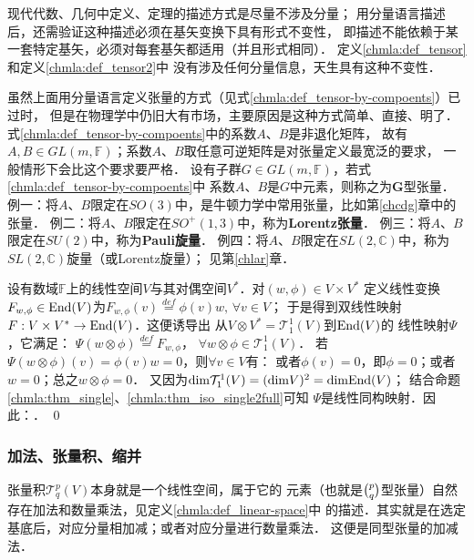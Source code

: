 现代代数、几何中定义、定理的描述方式是尽量不涉及分量；
用分量语言描述后，还需验证这种描述必须在基矢变换下具有形式不变性，
即描述不能依赖于某一套特定基矢，必须对每套基矢都适用（并且形式相同）．
定义\ref{chmla:def_tensor}和定义\ref{chmla:def_tensor2}中
没有涉及任何分量信息，天生具有这种不变性．

虽然上面用分量语言定义张量的方式（见式\eqref{chmla:def_tensor-by-compoents}）已过时，
但是在物理学中仍旧大有市场，主要原因是这种方式简单、直接、明了．
式\eqref{chmla:def_tensor-by-compoents}中的系数$A$、$B$是非退化矩阵，
故有$A,B\in GL(m,\mathbb{F})$；系数$A$、$B$取任意可逆矩阵是对张量定义最宽泛的要求，
一般情形下会比这个要求要严格．
设有子群$G\in GL(m,\mathbb{F})$，若式\eqref{chmla:def_tensor-by-compoents}中
系数$A$、$B$是$G$中元素，则称之为{\heiti $\boldsymbol{G}$型张量．}
{\kaishu 例一}：将$A$、$B$限定在$SO(3)$中，是牛顿力学中常用张量，比如第\ref{chcdg}章中的张量．
{\kaishu 例二}：将$A$、$B$限定在$SO^{+}(1,3)$中，称为{\heiti \bfseries Lorentz张量}．
{\kaishu 例三}：将$A$、$B$限定在$SU(2)$中，称为{\heiti \bfseries Pauli旋量}．
{\kaishu 例四}：将$A$、$B$限定在$SL(2,\mathbb{C})$中，称为$SL(2,\mathbb{C})${\heiti 旋量}（或Lorentz旋量）；
见第\ref{chlar}章．

  

\begin{example}\label{chmla:exm_T11TR}
    设有数域$\mathbb{F}$上的线性空间$V$与其对偶空间$V^*$．对$(w,\phi)\in V\times V^*$
    定义线性变换$F_{w,\phi} \in {\rm End} (V)$为$F_{w,\phi}(v)\overset{def}{=}\phi(v) w, \, \forall v \in V$；
    于是得到双线性映射$F: V\times V^* \to {\rm End}(V)$．这便诱导出
    从$V\otimes V^*= \mathcal{T}^1_1(V)$到${\rm End}(V)$的
    线性映射$\Psi$，它满足：
        $\Psi ( w\otimes \phi ) \overset{def}{=} F_{w,\phi}$，
        $\forall w\otimes \phi \in \mathcal{T}^1_1(V) $．
    若$\Psi( w\otimes \phi ) (v)= \phi(v) w =0$，则$\forall v\in V$有：
    或者$\phi(v)=0$，即$\phi=0$；或者$w=0$；总之$w\otimes \phi =0$．
    又因为${\rm dim} \mathcal{T}^1_1(V) = ({\rm dim}V)^2 = {\rm dim} {\rm End} (V)$；
    结合命题\ref{chmla:thm_single}、\ref{chmla:thm_iso_single2full}可知
    $\Psi$是线性同构映射．因此：． \qed
\end{example}



\subsubsection*{加法、张量积、缩并}
张量积$\mathcal{T}^p_q(V)$本身就是一个线性空间，属于它的
元素（也就是$\binom{p}{q}$型张量）自然存在加法和数量乘法，见定义\ref{chmla:def_linear-space}中
的描述．其实就是在选定基底后，对应分量相加减；或者对应分量进行数量乘法．
这便是同型张量的{\heiti 加减法}．

